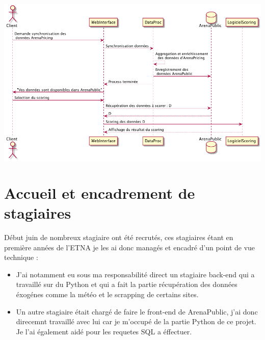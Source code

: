 \begin{center}
\includegraphics[scale=0.52]{images/scoring.png}
\label{scoring}
\end{center}


\section{Accueil et encadrement de stagiaires}
Début juin de nombreux stagiaire ont été recrutés, ces stagiaires étant en première années de l'ETNA je les ai donc managés et encadré d'un point de vue technique :
\begin{itemize}
	\item[\textbullet] J'ai notamment eu sous ma responsabilité direct un stagiaire back-end qui a travaillé sur du Python et qui a fait la partie récupération des données éxogénes comme la météo et le scrapping de certains sites. 
	\item[\textbullet] Un autre stagiaire était chargé de faire le front-end de ArenaPublic, j'ai donc direcemnt travaillé avec lui car je m'occupé de la partie Python de ce projet. Je l'ai également aidé pour les requetes SQL a éffectuer.
\end{itemize}

  


